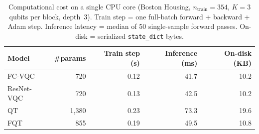 \begin{table}[t]
\centering
\caption{Computational cost on a single CPU core (Boston Housing, $n_{\text{train}}{=}354$, $K{=}3$ qubits per block, depth~3). Train step = one full-batch forward + backward + Adam step. Inference latency = median of 50 single-sample forward passes. On-disk = serialized \texttt{state\_dict} bytes.}
\label{tab:compute}
\small
\begin{tabular}{lrrrr}
\toprule
Model & \#params & Train step (s) & Inference (ms) & On-disk (KB) \\
\midrule
FC-VQC & 720 & 0.12 & 41.7 & 10.2 \\
ResNet-VQC & 720 & 0.13 & 42.5 & 10.2 \\
QT & 1,380 & 0.23 & 73.3 & 19.6 \\
FQT & 855 & 0.19 & 49.5 & 10.8 \\
\bottomrule
\end{tabular}
\vspace{-5pt}
\end{table}